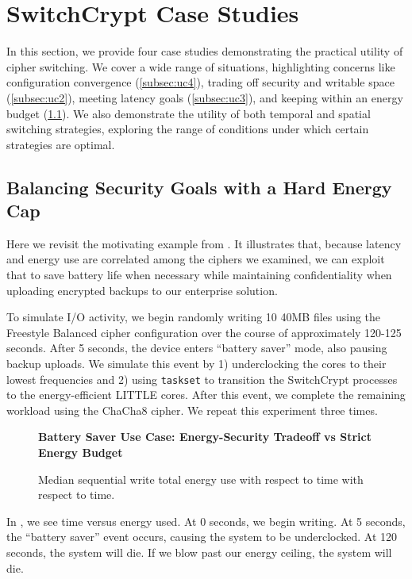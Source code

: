\section{SwitchCrypt Case Studies} \label{sec:usecases}

In this section, we provide four case studies demonstrating the practical
utility of cipher switching. We cover a wide range of situations, highlighting
concerns like configuration convergence (\cref{subsec:uc4}), trading off
security and writable space (\cref{subsec:uc2}), meeting latency goals
(\cref{subsec:uc3}), and keeping within an energy budget (\cref{subsec:uc1}). We
also demonstrate the utility of both temporal and spatial switching strategies,
exploring the range of conditions under which certain strategies are optimal.

\subsection{Balancing Security Goals with a Hard Energy Cap} \label{subsec:uc1}

Here we revisit the motivating example from . It illustrates
that, because latency and energy use are correlated among the ciphers we
examined, we can exploit that to save battery life when necessary while
maintaining confidentiality when uploading encrypted backups to our
enterprise solution.

To simulate I/O activity, we begin randomly writing 10 40MB files using the
Freestyle Balanced cipher configuration over the course of approximately 120-125
seconds. After 5 seconds, the device enters ``battery saver'' mode, also pausing
backup uploads. We simulate this event by 1) underclocking the cores to their
lowest frequencies and 2) using \texttt{taskset} to transition the SwitchCrypt
processes to the energy-efficient LITTLE cores. After this event, we complete
the remaining workload using the ChaCha8 cipher. We repeat this experiment three
times.

\begin{figure}[ht] \textbf{Battery Saver Use Case: Energy-Security Tradeoff vs
   Strict Energy Budget}\par\medskip
   \centering
   {} \caption{Median sequential write total
   energy use with respect to time with respect to time.}
  \label{fig:usecase-battery}
\end{figure}

In , we see time versus energy used. At 0 seconds, we
begin writing. At 5 seconds, the ``battery saver'' event occurs, causing the
system to be underclocked. At 120 seconds, the system will die. If we blow past
our energy ceiling, the system will die.

